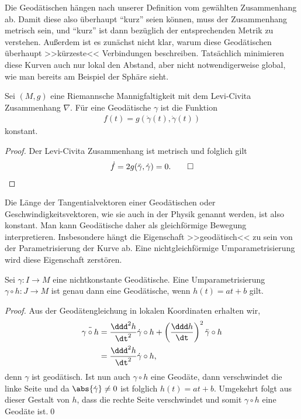 \documentclass[%
	paper=a5,%
	fleqn,%
	DIV=18,%
	BCOR=0mm,
	fontsize=11pt,
	titlepage=false,%
	bibliography=totoc,
	DIV=18,%
	twoside=true,
	pdftitle=Riemannsche Geometrie,
	pdfauthor=Uwe Semmelmann,
	numbers=noendperiod]%
	{scrbook}
\begin{document}
Die Geodätischen hängen nach unserer Definition vom gewählten Zusammenhang ab. Damit diese also überhaupt ``kurz'' seien können, muss der Zusammenhang metrisch sein, und ``kurz'' ist dann bezüglich der entsprechenden Metrik zu verstehen.
Außerdem ist es zunächst nicht klar, warum diese Geodätischen überhaupt >>kürzeste<< Verbindungen
beschreiben. Tatsächlich minimieren diese Kurven auch nur lokal den Abstand,
aber nicht notwendigerweise global, wie man bereits am Beispiel der Sphäre
sieht.

\begin{lem}
Sei $(M,g)$ eine Riemannsche Mannigfaltigkeit mit dem Levi-Civita
Zusammenhang $\nabla$. Für eine Geodätische $\gamma$ ist die Funktion
\begin{align*}
f(t) = g(\dot{\gamma}(t),\dot{\gamma}(t))
\end{align*}
konstant.\fish
\end{lem}
\begin{proof}
Der Levi-Civita Zusammenhang ist metrisch und folglich gilt
\begin{align*}
\dot{f} = 2g(\ddot{\gamma},\dot\gamma) = 0.\qed
\end{align*}
\end{proof}

Die Länge der Tangentialvektoren einer Geodätischen oder Geschwindigkeitsvektoren, wie sie auch in
der Physik genannt werden,  ist also konstant. Man kann Geodätische
daher als gleichförmige Bewegung interpretieren. Insbesondere hängt die
Eigenschaft >>geodätisch<< zu sein von der Parametrisierung der Kurve ab. Eine
nichtgleichförmige Umparametrisierung wird diese Eigenschaft zerstören.

\begin{lem}
Sei $\gamma: I\to M$ eine nichtkonstante Geodätische. Eine Umparametrisierung $\gamma\circ h : J\to M$ ist genau dann eine Geodätische, wenn $h(t) = at + b$ gilt.\fish
\end{lem}
\begin{proof}
Aus der Geodätengleichung in lokalen Koordinaten erhalten wir,
\begin{align*}
\ddot{\gamma\circ h} &= \frac{\ddd^2 h}{\dt^2} \dot{\gamma}\circ h + 
\left( \frac{\ddd h}{\dt}\right)^2 \ddot{\gamma}\circ h\\
&=\frac{\ddd^2 h}{\dt^2} \dot{\gamma}\circ h,
\end{align*}
denn $\gamma$ ist geodätisch. Ist nun auch $\gamma\circ h$ eine Geodäte, dann verschwindet die linke Seite und da $\abs{\dot\gamma}\neq 0$ ist folglich $h(t) = at+b$. Umgekehrt folgt aus dieser Gestalt von $h$, dass die rechte Seite verschwindet und somit $\gamma\circ h$ eine Geodäte ist.\qed
\end{proof}
\end{document}
